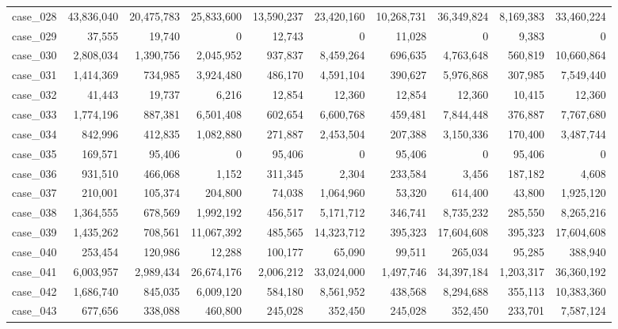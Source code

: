 \begin{footnotesize}
\begin{longtable}{l r rr rr rr rr}
case\_028 & 43{,}836{,}040 & 20{,}475{,}783 & 25{,}833{,}600 & 13{,}590{,}237 & 23{,}420{,}160 & 10{,}268{,}731 & 36{,}349{,}824 & 8{,}169{,}383 & 33{,}460{,}224 \\
case\_029 & 37{,}555 & 19{,}740 & 0 & 12{,}743 & 0 & 11{,}028 & 0 & 9{,}383 & 0 \\
case\_030 & 2{,}808{,}034 & 1{,}390{,}756 & 2{,}045{,}952 & 937{,}837 & 8{,}459{,}264 & 696{,}635 & 4{,}763{,}648 & 560{,}819 & 10{,}660{,}864 \\
case\_031 & 1{,}414{,}369 & 734{,}985 & 3{,}924{,}480 & 486{,}170 & 4{,}591{,}104 & 390{,}627 & 5{,}976{,}868 & 307{,}985 & 7{,}549{,}440 \\
case\_032 & 41{,}443 & 19{,}737 & 6{,}216 & 12{,}854 & 12{,}360 & 12{,}854 & 12{,}360 & 10{,}415 & 12{,}360 \\
case\_033 & 1{,}774{,}196 & 887{,}381 & 6{,}501{,}408 & 602{,}654 & 6{,}600{,}768 & 459{,}481 & 7{,}844{,}448 & 376{,}887 & 7{,}767{,}680 \\
case\_034 & 842{,}996 & 412{,}835 & 1{,}082{,}880 & 271{,}887 & 2{,}453{,}504 & 207{,}388 & 3{,}150{,}336 & 170{,}400 & 3{,}487{,}744 \\
case\_035 & 169{,}571 & 95{,}406 & 0 & 95{,}406 & 0 & 95{,}406 & 0 & 95{,}406 & 0 \\
case\_036 & 931{,}510 & 466{,}068 & 1{,}152 & 311{,}345 & 2{,}304 & 233{,}584 & 3{,}456 & 187{,}182 & 4{,}608 \\
case\_037 & 210{,}001 & 105{,}374 & 204{,}800 & 74{,}038 & 1{,}064{,}960 & 53{,}320 & 614{,}400 & 43{,}800 & 1{,}925{,}120 \\
case\_038 & 1{,}364{,}555 & 678{,}569 & 1{,}992{,}192 & 456{,}517 & 5{,}171{,}712 & 346{,}741 & 8{,}735{,}232 & 285{,}550 & 8{,}265{,}216 \\
case\_039 & 1{,}435{,}262 & 708{,}561 & 11{,}067{,}392 & 485{,}565 & 14{,}323{,}712 & 395{,}323 & 17{,}604{,}608 & 395{,}323 & 17{,}604{,}608 \\
case\_040 & 253{,}454 & 120{,}986 & 12{,}288 & 100{,}177 & 65{,}090 & 99{,}511 & 265{,}034 & 95{,}285 & 388{,}940 \\
case\_041 & 6{,}003{,}957 & 2{,}989{,}434 & 26{,}674{,}176 & 2{,}006{,}212 & 33{,}024{,}000 & 1{,}497{,}746 & 34{,}397{,}184 & 1{,}203{,}317 & 36{,}360{,}192 \\
case\_042 & 1{,}686{,}740 & 845{,}035 & 6{,}009{,}120 & 584{,}180 & 8{,}561{,}952 & 438{,}568 & 8{,}294{,}688 & 355{,}113 & 10{,}383{,}360 \\
case\_043 & 677{,}656 & 338{,}088 & 460{,}800 & 245{,}028 & 352{,}450 & 245{,}028 & 352{,}450 & 233{,}701 & 7{,}587{,}124 \\

\end{longtable}
\end{footnotesize}
